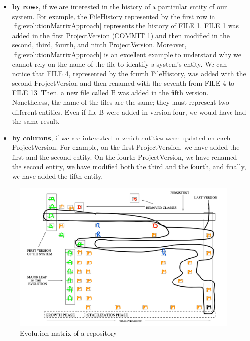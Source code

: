  \begin{itemize}
     \item \textbf{by rows}, if we are interested in the history of a particular entity of our system. 
     For example, the FileHistory represented by the first row in \autoref{fig:evolutionMatrixApproach} represents the history of FILE 1. 
     FILE 1 was added in the first ProjectVersion (COMMIT 1) and then modified in the second, third, fourth, and ninth ProjectVersion.
     Moreover, \autoref{fig:evolutionMatrixApproach} is an excellent example to understand why we cannot rely on the name of the file to identify a system's entity. 
     We can notice that FILE 4, represented by the fourth FileHistory, was added with the second ProjectVersion and then renamed with the seventh from FILE 4 to FILE 13. 
     Then, a new file called B was added in the fifth version. Nonetheless, the name of the files are the same; they must represent two different entities. 
     Even if file B were added in version four, we would have had the same result. 
     \item \textbf{by columns}, if we are interested in which entities were updated on each ProjectVersion. 
    For example, on the first ProjectVersion, we have added the first and the second entity. 
    On the fourth ProjectVersion, we have renamed the second entity, we have modified both the third and the fourth, and finally, we have added the fifth entity.
 \end{itemize}

\begin{figure}
    \center
    \includegraphics[width=\textwidth]{ApproachMatrix2.png}
    \caption{Evolution matrix of a repository}
    \label{fig:evolutionMatrixApproach2}
\end{figure}

